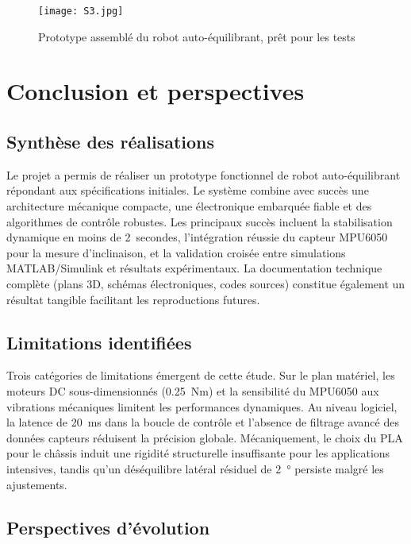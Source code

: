 \documentclass{report}
\begin{document}
\begin{figure}[htbp]
    \centering
    \texttt{[image: S3.jpg]}
    \caption{Prototype assemblé du robot auto-équilibrant, prêt pour les tests}
    \label{fig:prototype_final}
\end{figure}
\chapter{Conclusion et perspectives}
\label{chap:conclusion}

\section*{Synthèse des réalisations}

Le projet a permis de réaliser un prototype fonctionnel de robot auto-équilibrant répondant aux spécifications initiales. Le système combine avec succès une architecture mécanique compacte, une électronique embarquée fiable et des algorithmes de contrôle robustes. Les principaux succès incluent la stabilisation dynamique en moins de \SI{2}{secondes}, l'intégration réussie du capteur MPU6050 pour la mesure d'inclinaison, et la validation croisée entre simulations MATLAB/Simulink et résultats expérimentaux. La documentation technique complète (plans 3D, schémas électroniques, codes sources) constitue également un résultat tangible facilitant les reproductions futures.

\section*{Limitations identifiées}

Trois catégories de limitations émergent de cette étude. Sur le plan matériel, les moteurs DC sous-dimensionnés (\SI{0.25}{Nm}) et la sensibilité du MPU6050 aux vibrations mécaniques limitent les performances dynamiques. Au niveau logiciel, la latence de \SI{20}{ms} dans la boucle de contrôle et l'absence de filtrage avancé des données capteurs réduisent la précision globale. Mécaniquement, le choix du PLA pour le châssis induit une rigidité structurelle insuffisante pour les applications intensives, tandis qu'un déséquilibre latéral résiduel de \SI{2}{\degree} persiste malgré les ajustements.

\section*{Perspectives d'évolution}
\end{document}
